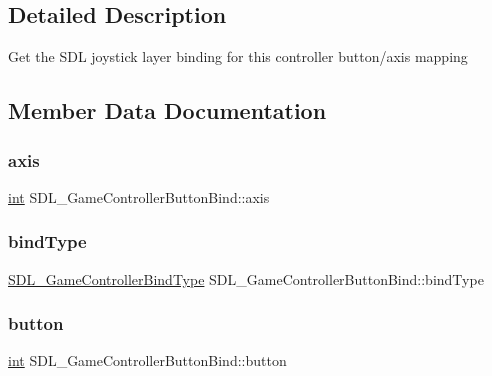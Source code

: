 \subsection{Detailed Description}
Get the S\+DL joystick layer binding for this controller button/axis mapping 

\subsection{Member Data Documentation}
\mbox{\label{struct_s_d_l___game_controller_button_bind_a2ffbc482f5aadcbb8df97d406708f456}} 
\subsubsection{\texorpdfstring{axis}{axis}}
{\footnotesize\ttfamily \mbox{\hyperlink{warnings_8h_a74f207b5aa4ba51c3a2ad59b219a423b}{int}} S\+D\+L\+\_\+\+Game\+Controller\+Button\+Bind\+::axis}

\mbox{\label{struct_s_d_l___game_controller_button_bind_a032fd941b0e8e5e2cdf52b7597f559b9}} 
\subsubsection{\texorpdfstring{bindType}{bindType}}
{\footnotesize\ttfamily \mbox{\hyperlink{_s_d_l__gamecontroller_8h_aff63e7281b46e5275134938c52f5d6fa}{S\+D\+L\+\_\+\+Game\+Controller\+Bind\+Type}} S\+D\+L\+\_\+\+Game\+Controller\+Button\+Bind\+::bind\+Type}

\mbox{\label{struct_s_d_l___game_controller_button_bind_a2657029cfc39aa91b5b5342d4a037d95}} 
\subsubsection{\texorpdfstring{button}{button}}
{\footnotesize\ttfamily \mbox{\hyperlink{warnings_8h_a74f207b5aa4ba51c3a2ad59b219a423b}{int}} S\+D\+L\+\_\+\+Game\+Controller\+Button\+Bind\+::button}

